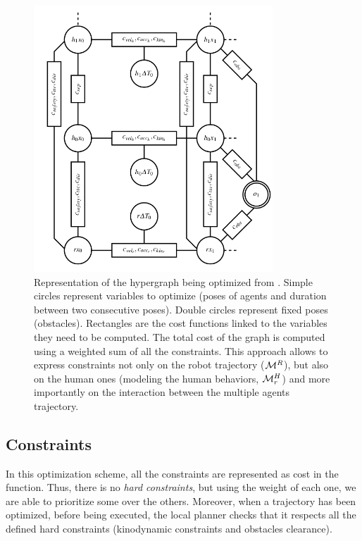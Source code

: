 \documentclass[a4paper,11pt,twoside]{StyleThese}
\begin{document}
\begin{figure}[hbtp]
\centering
\includegraphics[width=0.8\textwidth]{figures/chapter2/hateb_graph.png}
\caption{Representation of the hypergraph being optimized from \cite{khambhaita_viewing_2017}. Simple circles represent variables to optimize (poses of agents and duration between two consecutive poses). Double circles represent fixed poses (obstacles). Rectangles are the cost functions linked to the variables they need to be computed. The total cost of the graph is computed using a weighted sum of all the constraints. This approach allows to express constraints not only on the robot trajectory ($\mathcal{M}^R$), but also on the human ones (modeling the human behaviors, $\mathcal{M}^H_r$) and more importantly on the interaction between the multiple agents trajectory.}
\label{fig:hateb_graph}
\end{figure}


\subsection{Constraints}
In this optimization scheme, all the constraints are represented as cost in the function. Thus, there is no \textit{hard constraints}, but using the weight of each one, we are able to prioritize some over the others. Moreover, when a trajectory has been optimized, before being executed, the local planner checks that it respects all the defined hard constraints (kinodynamic constraints and obstacles clearance).
\end{document}
